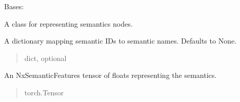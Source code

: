 \documentclass[letterpaper,10pt,english]{sphinxmanual}
\begin{document}
\begin{fulllineitems}
\label{\detokenize{nodes:nodes.nodeTensors.Semantic}}
\pysigstartsignatures
\pysiglinewithargsret
{}
{\sphinxparamcomma {}\sphinxparamcomma {}\sphinxparamcomma {}}
{}
\pysigstopsignatures
\sphinxAtStartPar
Bases: 

\sphinxAtStartPar
A class for representing semantics nodes.

\begin{fulllineitems}
\label{\detokenize{nodes:nodes.nodeTensors.Semantic.names}}
\pysigstartsignatures
\pysigline
{}
\pysigstopsignatures
\sphinxAtStartPar
A dictionary mapping semantic IDs to semantic names. Defaults to None.
\begin{quote}\begin{description}
\sphinxAtStartPar
dict, optional

\end{description}\end{quote}

\end{fulllineitems}


\begin{fulllineitems}
\label{\detokenize{nodes:nodes.nodeTensors.Semantic.nodes}}
\pysigstartsignatures
\pysigline
{}
\pysigstopsignatures
\sphinxAtStartPar
An NxSemanticFeatures tensor of floats representing the semantics.
\begin{quote}\begin{description}
\sphinxAtStartPar
torch.Tensor

\end{description}\end{quote}


\end{fulllineitems}
\end{fulllineitems}
\end{document}
